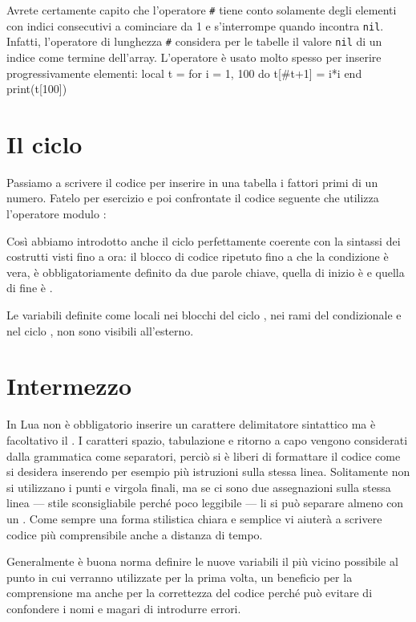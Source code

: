 Avrete certamente capito che l'operatore \texttt{\#} tiene conto solamente
degli elementi con indici consecutivi a cominciare da 1 e s'interrompe quando
incontra \texttt{nil}. Infatti, l'operatore di lunghezza \texttt{\#} considera
per le tabelle il valore \texttt{nil} di un indice come termine dell'array.
L'operatore è usato molto spesso per inserire progressivamente elementi:
\lines
local t = {}
for i = 1, 100 do
    t[#t+1] = i*i
end
print(t[100])
\endlines
{}


\section{Il ciclo }
\label{secCicloWhile}

Passiamo a scrivere il codice per inserire in una tabella i fattori primi di un
numero. Fatelo per esercizio e poi confrontate il codice seguente che utilizza
l'operatore modulo \key{\%}:

Così abbiamo introdotto anche il ciclo  perfettamente coerente con
la sintassi dei costrutti visti fino a ora: il blocco di codice ripetuto fino a
che la condizione è vera, è obbligatoriamente definito da due parole chiave,
quella di inizio è  e quella di fine è .

Le variabili definite come locali nei blocchi del ciclo , nei rami del
condizionale  e nel ciclo , non sono visibili all'esterno.


\section{Intermezzo}

In Lua non è obbligatorio inserire un carattere delimitatore sintattico ma è
facoltativo il \key{;}. I caratteri spazio, tabulazione e ritorno a capo vengono
considerati dalla grammatica come separatori, perciò si è liberi di formattare
il codice come si desidera inserendo per esempio più istruzioni sulla stessa
linea. Solitamente non si utilizzano i punti e virgola finali, ma se ci sono due
assegnazioni sulla stessa linea --- stile sconsigliabile perché poco leggibile
--- li si può separare almeno con un \key{;}. Come sempre una forma stilistica
chiara e semplice vi aiuterà a scrivere codice più comprensibile anche a
distanza di tempo.

Generalmente è buona norma definire le nuove variabili il più vicino possibile
al punto in cui verranno utilizzate per la prima volta, un beneficio per la
comprensione ma anche per la correttezza del codice perché può evitare di
confondere i nomi e magari di introdurre errori.


